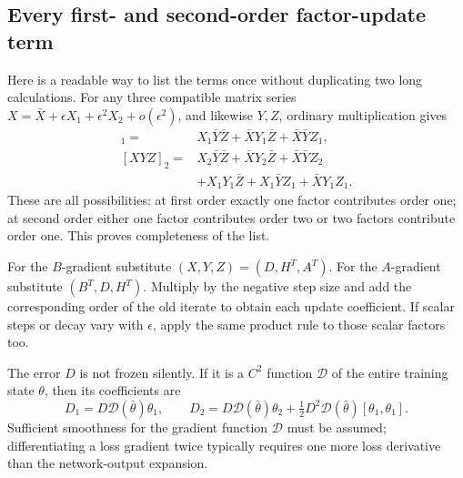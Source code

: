 \documentclass[12pt,a4paper]{article}
\theoremstyle{readable}
\theoremstyle{definition}\newtheorem{example}[theorem]{Example}
\begin{document}
\subsection{Every first- and second-order factor-update term}
Here is a readable way to list the terms once without duplicating two long calculations. For any three compatible matrix series
\(X=\bar X+\epsilon X_1+\epsilon^2X_2+o(\epsilon^2)\), and likewise \(Y,Z\), ordinary multiplication gives
\begin{align*}
[XYZ]_1={}&X_1\bar Y\bar Z+\bar X Y_1\bar Z+\bar X\bar YZ_1,\\
[XYZ]_2={}&X_2\bar Y\bar Z+\bar X Y_2\bar Z+\bar X\bar YZ_2\\
&+X_1Y_1\bar Z+X_1\bar YZ_1+\bar X Y_1Z_1.
\end{align*}
These are all possibilities: at first order exactly one factor contributes order one; at second order either one factor contributes order two or two factors contribute order one. This proves completeness of the list.

For the \(B\)-gradient substitute \((X,Y,Z)=(D,H^T,A^T)\). For the \(A\)-gradient substitute \((B^T,D,H^T)\). Multiply by the negative step size and add the corresponding order of the old iterate to obtain each update coefficient. If scalar steps or decay vary with \(\epsilon\), apply the same product rule to those scalar factors too.

The error \(D\) is not frozen silently. If it is a \(C^2\) function \(\mathcal D\) of the entire training state \(\theta\), then its coefficients are
\[
D_1=D\mathcal D(\bar\theta)\theta_1,\qquad
D_2=D\mathcal D(\bar\theta)\theta_2
+\tfrac12D^2\mathcal D(\bar\theta)[\theta_1,\theta_1].
\]
Sufficient smoothness for the gradient function \(\mathcal D\) must be assumed; differentiating a loss gradient twice typically requires one more loss derivative than the network-output expansion.
\end{document}
